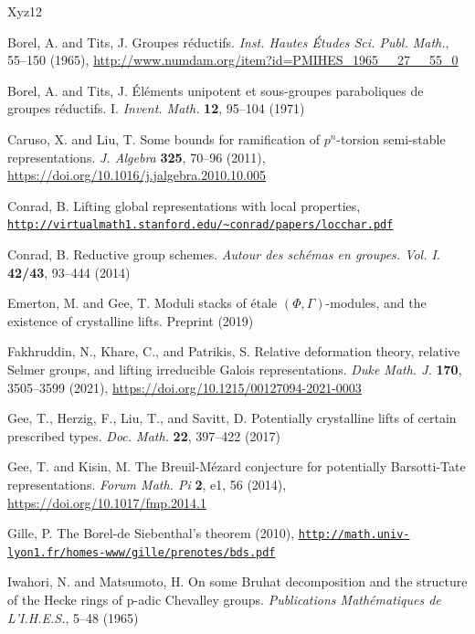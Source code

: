 \documentclass[10pt,a4paper,twoside]{article}
\begin{document}
\begin{thebibliography}{Xyz12}
\raggedright{
Borel, A. and Tits, J. Groupes réductifs. {\em Inst. Hautes Études Sci. Publ. Math.}, 55--150 (1965),} \url{http://www.numdam.org/item?id=PMIHES\_1965\_\_27\_\_55\_0}


Borel, A. and Tits, J. \'El\'ements unipotent et sous-groupes paraboliques de groupes r\'eductifs. I. {\em Invent. Math.} \textbf{12}, 95--104 (1971)

Caruso, X. and Liu, T. Some bounds for ramification of $p^n$-torsion semi-stable representations. {\em J. Algebra} \textbf{325}, 70--96 (2011), 
\url{https://doi.org/10.1016/j.jalgebra.2010.10.005}

\def\urlsplit#1#2{\href{#1#2}{\nolinkurl{#1}}\break\href{#1#2}{\nolinkurl{#2}}}
Conrad, B. Lifting global representations with local properties, \urlsplit{http://virtualmath1.stanford.edu/~conrad/papers/}{locchar.pdf}



Conrad, B. Reductive group schemes. {\em Autour des sch\'emas en groupes. Vol. I}. \textbf{42/43}, 93--444 (2014)

Emerton, M. and Gee, T. Moduli stacks of \'etale $(\Phi, \Gamma)$-modules, and the existence of crystalline lifts. Preprint (2019)

Fakhruddin, N., Khare, C., and Patrikis, S. Relative deformation theory, relative Selmer groups, and lifting irreducible Galois representations. {\em Duke Math. J.} \textbf{170}, 3505--3599 (2021), \url{https://doi.org/10.1215/00127094-2021-0003}

Gee, T., Herzig, F., Liu, T., and Savitt, D. Potentially crystalline lifts of certain prescribed types. {\em Doc. Math.} \textbf{22}, 397--422 (2017)

Gee, T. and Kisin, M. The Breuil-Mézard conjecture for potentially Barsotti-Tate representations. {\em Forum Math. Pi} \textbf{2}, e1, 56 (2014), 
\url{https://doi.org/10.1017/fmp.2014.1}


\raggedright{
Gille, P. The Borel-de Siebenthal’s theorem (2010),}
\urlsplit{http://math.univ-lyon1.fr/homes-www/gille/prenotes/}{bds.pdf}




Iwahori, N. and Matsumoto, H. On some Bruhat decomposition and the structure of the Hecke rings of p-adic Chevalley groups. {\em Publications Mathématiques de L'I.H.E.S.}, 5--48 (1965)


\end{thebibliography}
\end{document}
